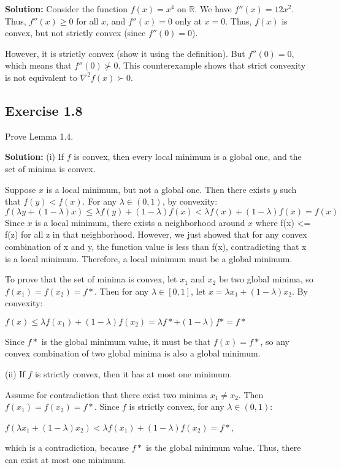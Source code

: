 \documentclass{article}
\begin{document}
\textbf{Solution:}
Consider the function $f(x) = x^4$ on $\mathbb{R}$. We have $f''(x) = 12x^2$. Thus, $f''(x) \geq 0$ for all $x$, and $f''(x) = 0$ only at $x = 0$. Thus, $f(x)$ is convex, but not strictly convex (since $f''(0) = 0$).

However, it is strictly convex (show it using the definition). But $f''(0) = 0$, which means that $f''(0) \not\succ 0$. This counterexample shows that strict convexity is not equivalent to $\nabla^2 f(x) \succ 0$.

\subsection*{Exercise 1.8}
Prove Lemma 1.4.

\textbf{Solution:}
(i) If $f$ is convex, then every local minimum is a global one, and the set of minima is convex.

Suppose $x$ is a local minimum, but not a global one. Then there exists $y$ such that $f(y) < f(x)$. For any $\lambda \in (0,1)$, by convexity:
$$f(\lambda y + (1-\lambda)x) \leq \lambda f(y) + (1-\lambda)f(x) < \lambda f(x) + (1-\lambda)f(x) = f(x)$$
Since $x$ is a local minimum, there exists a neighborhood around $x$ where f(x) <= f(z) for all z in that neighborhood.  However, we just showed that for any convex combination of x and y, the function value is less than f(x), contradicting that x is a local minimum. Therefore, a local minimum must be a global minimum.

To prove that the set of minima is convex, let $x_1$ and $x_2$ be two global minima, so $f(x_1) = f(x_2) = f*$.  Then for any $\lambda \in [0, 1]$, let $x = \lambda x_1 + (1 - \lambda)x_2$.  By convexity:

$f(x) \leq \lambda f(x_1) + (1 - \lambda) f(x_2) = \lambda f* + (1 - \lambda) f* = f*$

Since $f*$ is the global minimum value, it must be that $f(x) = f*$, so any convex combination of two global minima is also a global minimum.

(ii) If $f$ is strictly convex, then it has at most one minimum.

Assume for contradiction that there exist two minima $x_1 \neq x_2$. Then $f(x_1) = f(x_2) = f*$. Since $f$ is strictly convex, for any $\lambda \in (0, 1)$:

$f(\lambda x_1 + (1 - \lambda) x_2) < \lambda f(x_1) + (1 - \lambda) f(x_2) = f*$,

which is a contradiction, because $f*$ is the global minimum value. Thus, there can exist at most one minimum.
\end{document}
